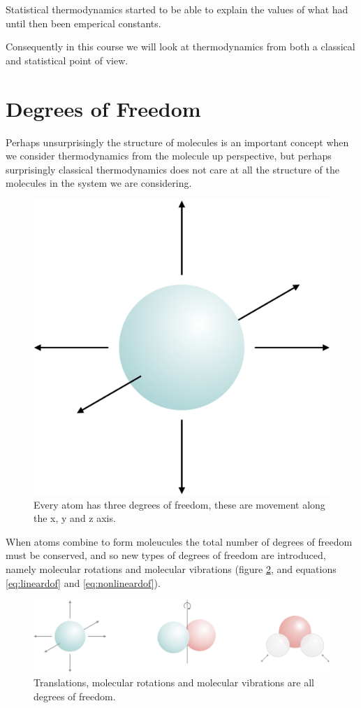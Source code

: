 \documentclass[
]{book}
\begin{document}
Statistical thermodynamics started to be able to explain the values of what had until then been emperical constants.

Consequently in this course we will look at thermodynamics from both a classical and statistical point of view.

\hypertarget{sec:degreesoffreedom}{%
\section{Degrees of Freedom}\label{sec:degreesoffreedom}}

Perhaps unsurprisingly the structure of molecules is an important concept when we consider thermodynamics from the molecule up perspective, but perhaps surprisingly classical thermodynamics does not care at all the structure of the molecules in the system we are considering.

\begin{figure}

{\centering \includegraphics[width=0.3\linewidth]{images/atomdegrees} 

}

\caption{Every atom has three degrees of freedom, these are movement along the x, y and z axis.}\label{fig:atomdegrees}
\end{figure}

When atoms combine to form moleucules the total number of degrees of freedom must be conserved, and so new types of degrees of freedom are introduced, namely molecular rotations and molecular vibrations (figure \ref{fig:typesdegree}, and equations \eqref{eq:lineardof} and \eqref{eq:nonlineardof}).

\begin{figure}

{\centering \includegraphics[width=0.8\linewidth]{images/typesdegree} 

}

\caption{Translations, molecular rotations and molecular vibrations are all degrees of freedom.}\label{fig:typesdegree}
\end{figure}
\end{document}

